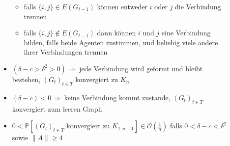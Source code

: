 \begin{description}
\begin{itemize}
\begin{itemize}
						\item falls $\{i,j\}\in E(G_{t-1})$ können entweder $i$ oder $j$ die Verbindung trennen
						\item falls $\{i,j\}\notin E(G_{t-1})$ dann können $i$ und $j$ eine Verbindung bilden, falls beide Agenten zustimmen, und beliebig viele andere ihrer Verbindungen trennen
					\end{itemize}
				\item $(\delta-c>\delta^2>0)\Rightarrow$ jede Verbindung wird geformt und bleibt bestehen, $(G_t)_{t\in T}$ konvergiert zu $K_n$
				\item $(\delta-c)<0\Rightarrow$ keine Verbindung kommt zustande, $(G_t)_{t\in T}$ konvergiert zum leeren Graph
				\item $0<\mathbb{P}[(G_t)_{t\in T}\text{ konvergiert zu }K_{1,n-1}]\in \mathcal{O}(\frac{1}{n})$ falls $0<\delta-c<\delta^2$ sowie $\|A\|\geq 4$
			\end{itemize}
	\end{description}